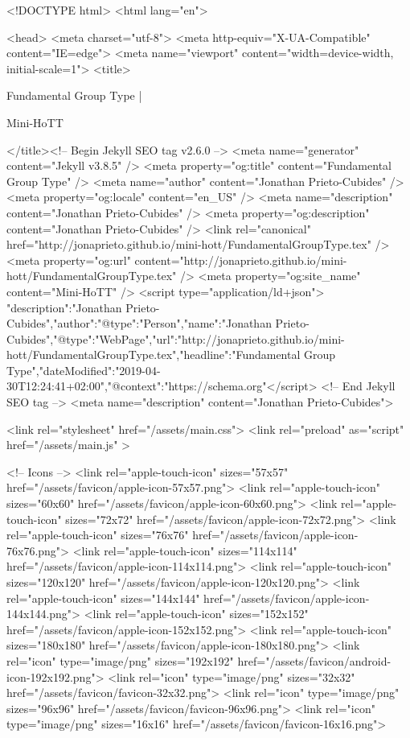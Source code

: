 <!DOCTYPE html>
<html lang="en">

<head>
  <meta charset="utf-8">
  <meta http-equiv="X-UA-Compatible" content="IE=edge">
  <meta name="viewport" content="width=device-width, initial-scale=1">
  <title>
    
      
        Fundamental Group Type |
      
        Mini-HoTT
    
  </title><!-- Begin Jekyll SEO tag v2.6.0 -->
<meta name="generator" content="Jekyll v3.8.5" />
<meta property="og:title" content="Fundamental Group Type" />
<meta name="author" content="Jonathan Prieto-Cubides" />
<meta property="og:locale" content="en_US" />
<meta name="description" content="Jonathan Prieto-Cubides" />
<meta property="og:description" content="Jonathan Prieto-Cubides" />
<link rel="canonical" href="http://jonaprieto.github.io/mini-hott/FundamentalGroupType.tex" />
<meta property="og:url" content="http://jonaprieto.github.io/mini-hott/FundamentalGroupType.tex" />
<meta property="og:site_name" content="Mini-HoTT" />
<script type="application/ld+json">
{"description":"Jonathan Prieto-Cubides","author":{"@type":"Person","name":"Jonathan Prieto-Cubides"},"@type":"WebPage","url":"http://jonaprieto.github.io/mini-hott/FundamentalGroupType.tex","headline":"Fundamental Group Type","dateModified":"2019-04-30T12:24:41+02:00","@context":"https://schema.org"}</script>
<!-- End Jekyll SEO tag -->
<meta name="description" content="Jonathan Prieto-Cubides">

  <link rel="stylesheet" href="/assets/main.css">
  <link rel="preload" as="script" href="/assets/main.js" >

  <!-- Icons -->
  <link rel="apple-touch-icon" sizes="57x57" href="/assets/favicon/apple-icon-57x57.png">
  <link rel="apple-touch-icon" sizes="60x60" href="/assets/favicon/apple-icon-60x60.png">
  <link rel="apple-touch-icon" sizes="72x72" href="/assets/favicon/apple-icon-72x72.png">
  <link rel="apple-touch-icon" sizes="76x76" href="/assets/favicon/apple-icon-76x76.png">
  <link rel="apple-touch-icon" sizes="114x114" href="/assets/favicon/apple-icon-114x114.png">
  <link rel="apple-touch-icon" sizes="120x120" href="/assets/favicon/apple-icon-120x120.png">
  <link rel="apple-touch-icon" sizes="144x144" href="/assets/favicon/apple-icon-144x144.png">
  <link rel="apple-touch-icon" sizes="152x152" href="/assets/favicon/apple-icon-152x152.png">
  <link rel="apple-touch-icon" sizes="180x180" href="/assets/favicon/apple-icon-180x180.png">
  <link rel="icon" type="image/png" sizes="192x192"  href="/assets/favicon/android-icon-192x192.png">
  <link rel="icon" type="image/png" sizes="32x32" href="/assets/favicon/favicon-32x32.png">
  <link rel="icon" type="image/png" sizes="96x96" href="/assets/favicon/favicon-96x96.png">
  <link rel="icon" type="image/png" sizes="16x16" href="/assets/favicon/favicon-16x16.png">

